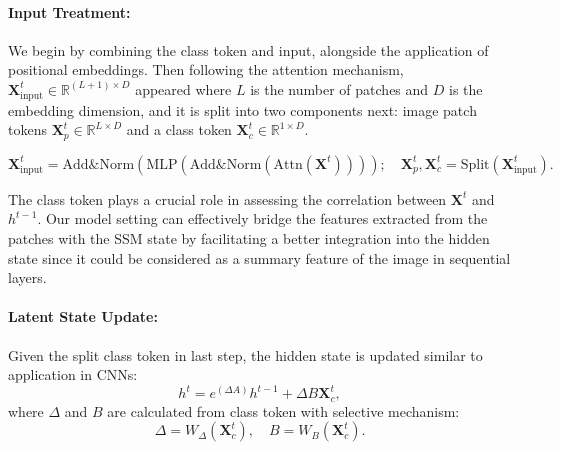 \paragraph{Input Treatment:} We begin by combining the class token and input, alongside the application of positional embeddings. 
Then following the attention mechanism, $\boldsymbol{X}^{t}_{\text{input}} \in \mathbb{R}^{(L+1)\times D}$ appeared where $L$ is the number of patches and $D$ is the embedding dimension, and it is split into two components next: image patch tokens $\boldsymbol{X}^{t}_p \in \mathbb{R}^{L\times D}$ and a class token $\boldsymbol{X}^{t}_c \in \mathbb{R}^{1 \times D}$.
\begin{small}
\begin{equation}
\boldsymbol{X}^{t}_{\text{input}} = \text{Add} \& \text{Norm}(\text{MLP}(\text{Add} \& \text{Norm}(\text{Attn}(\boldsymbol{X}^{t}))));   \quad \boldsymbol{X}^{t}_p, \boldsymbol{X}^{t}_c = \text{Split}(\boldsymbol{X}^{t}_{\text{input}}).
\end{equation}
\end{small}
The class token plays a crucial role in assessing the correlation between $\boldsymbol{X}^{t}$ and $h^{t-1}$. Our model setting can effectively bridge the features extracted from the patches with the SSM state by facilitating a better integration into the hidden state since it could be considered as a summary feature of the image in sequential layers. 

\paragraph{Latent State Update:} Given the split class token in last step, the hidden state is updated similar to application in CNNs:
\begin{equation}
    h^t = e^{(\Delta A)} h^{t-1} + \Delta B \boldsymbol{X}^{t}_c,
\end{equation}
where $\Delta$ and $B$ are calculated from class token with selective mechanism:
\begin{equation}
\Delta = W_{\Delta} (\boldsymbol{X}^{t}_c), \quad
    B = W_B (\boldsymbol{X}^{t}_c).
\end{equation}

